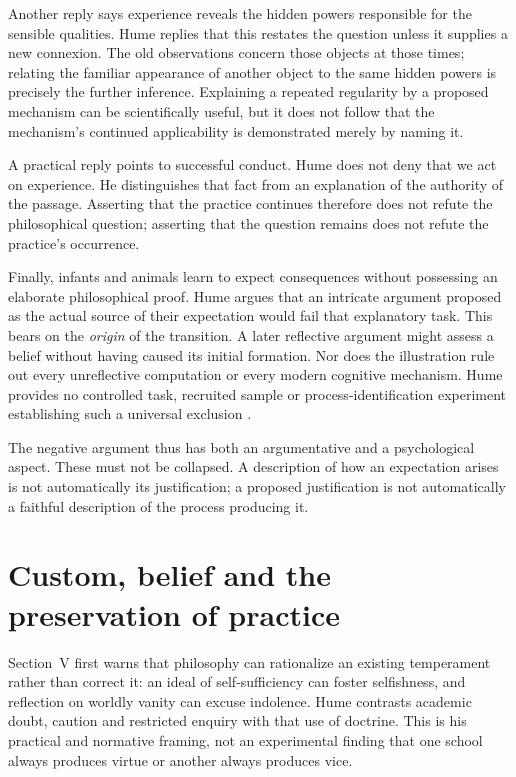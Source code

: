 Another reply says experience reveals the hidden powers responsible for
the sensible qualities. Hume replies that this restates the question
unless it supplies a new connexion. The old observations concern those
objects at those times; relating the familiar appearance of another
object to the same hidden powers is precisely the further inference.
Explaining a repeated regularity by a proposed mechanism can be
scientifically useful, but it does not follow that the mechanism's
continued applicability is demonstrated merely by naming it.

A practical reply points to successful conduct. Hume does not deny that
we act on experience. He distinguishes that fact from an explanation
of the authority of the passage. Asserting that the practice continues
therefore does not refute the philosophical question; asserting that
the question remains does not refute the practice's occurrence.

Finally, infants and animals learn to expect consequences without
possessing an elaborate philosophical proof. Hume argues that an
intricate argument proposed as the actual source of their expectation
would fail that explanatory task. This bears on the \emph{origin} of
the transition. A later reflective argument might assess a belief
without having caused its initial formation. Nor does the illustration
rule out every unreflective computation or every modern cognitive
mechanism. Hume provides no controlled task, recruited sample or
process-identification experiment establishing such a universal
exclusion \parencite[E~4.22--4.23, 9.5]{Hume1777EnquiryHTO}.

The negative argument thus has both an argumentative and a psychological
aspect. These must not be collapsed. A description of how an expectation
arises is not automatically its justification; a proposed justification
is not automatically a faithful description of the process producing it.

\section{Custom, belief and the preservation of practice}
\label{sec:p15-hume-custom}

Section~V first warns that philosophy can rationalize an existing
temperament rather than correct it: an ideal of self-sufficiency can
foster selfishness, and reflection on worldly vanity can excuse
indolence. Hume contrasts academic doubt, caution and restricted
enquiry with that use of doctrine. This is his practical and
normative framing, not an experimental finding that one school
always produces virtue or another always produces vice.


